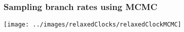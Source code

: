 \begin{frame}
\frametitle{Sampling branch rates using MCMC}

\texttt{[image: ../images/relaxedClocks/relaxedClockMCMC]}

\end{frame}